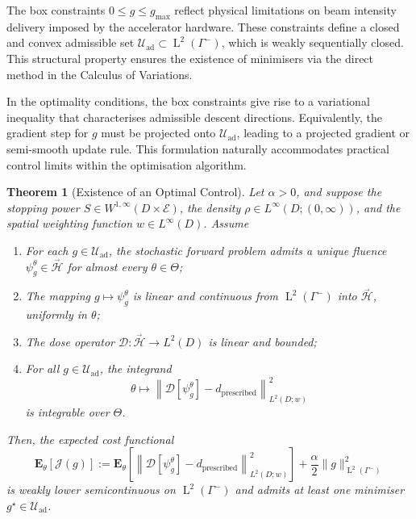 \documentclass{amsart}
\theoremstyle{plain}
\newtheorem{theorem}{Theorem}[section]
\newcommand{\leb}{\text{Leb}}
\newcommand{\LL}{\ensuremath{\operatorname L}\xspace}
\renewcommand{\leb}[1]{\ensuremath{\LL^{#1}}}
\newcommand{\cH}{\stackrel{_\rightarrow}{\mathscr H}}
\begin{document}
The box constraints $0 \leq g \leq g_{\max}$ reflect physical
limitations on beam intensity delivery imposed by the accelerator
hardware. These constraints define a closed and convex admissible set
$\mathcal{U}_{\mathrm{ad}} \subset \leb2(\Gamma^-)$, which is weakly
sequentially closed. This structural property ensures the existence of
minimisers via the direct method in the Calculus of Variations.

In the optimality conditions, the box constraints give rise to a
variational inequality that characterises admissible descent
directions. Equivalently, the gradient step for $g$ must be projected
onto $\mathcal{U}_{\mathrm{ad}}$, leading to a projected gradient or
semi-smooth update rule. This formulation naturally accommodates
practical control limits within the optimisation algorithm.

\begin{theorem}[Existence of an Optimal Control]
  Let $\alpha > 0$, and suppose the stopping power $S \in
  W^{1,\infty}(D \times \mathcal{E})$, the density $\rho \in
  L^\infty(D; (0,\infty))$, and the spatial weighting function $w \in
  L^\infty(D)$. Assume
  \begin{enumerate}
  \item For each $g \in \mathcal{U}_{\mathrm{ad}}$, the stochastic
    forward problem admits a unique fluence $\psi_g^\theta \in \cH$
    for almost every $\theta \in \Theta$;
  \item The mapping $g \mapsto \psi_g^\theta$ is linear and continuous
    from $\leb2(\Gamma^-)$ into $\cH$, uniformly in $\theta$;
  \item The dose operator $\mathcal{D}: \cH \to L^2(D)$ is linear and
    bounded;
  \item For all $g \in \mathcal{U}_{\mathrm{ad}}$, the integrand   
    \begin{equation}
      \theta \mapsto \left\| \mathcal{D}[\psi_g^\theta] - d_{\mathrm{prescribed}} \right\|^2_{L^2(D; w)}
    \end{equation}
    is integrable over $\Theta$.
  \end{enumerate}
  Then, the expected cost functional
  \begin{equation}
    \mathbf{E}_\theta\left[ \mathcal{J}(g) \right] :=
    \mathbf{E}_\theta \left[ \left\| \mathcal{D}[\psi_g^\theta] - d_{\mathrm{prescribed}} \right\|^2_{L^2(D; w)} \right]
    + \frac{\alpha}{2} \| g \|^2_{\leb2(\Gamma^-)}
  \end{equation}
  is weakly lower semicontinuous on $\leb2(\Gamma^-)$ and admits at
  least one minimiser $g^\star \in \mathcal{U}_{\mathrm{ad}}$.
\end{theorem}
\end{document}

